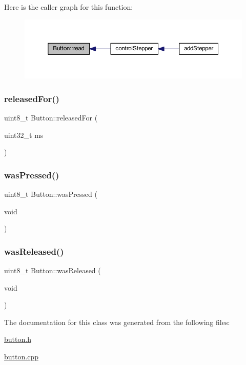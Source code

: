 Here is the caller graph for this function\+:\nopagebreak
\begin{figure}[H]
\begin{center}
\leavevmode
\includegraphics[width=350pt]{class_button_a5f5c0d23ab0e5387b861e68019a7e85d_icgraph}
\end{center}
\end{figure}
\mbox{\label{class_button_a805e542eaf9976b7c1afaf3dfecc13a5}} 
\subsubsection{\texorpdfstring{released\+For()}{releasedFor()}}
{\footnotesize\ttfamily uint8\+\_\+t Button\+::released\+For (\begin{DoxyParamCaption}\item[{uint32\+\_\+t}]{ms }\end{DoxyParamCaption})}

\mbox{\label{class_button_a3496a1689b2b2f5635d5c7716f38ec43}} 
\subsubsection{\texorpdfstring{was\+Pressed()}{wasPressed()}}
{\footnotesize\ttfamily uint8\+\_\+t Button\+::was\+Pressed (\begin{DoxyParamCaption}\item[{void}]{ }\end{DoxyParamCaption})}

\mbox{\label{class_button_a79164a7fd70f08cb8c3930e8c06b9190}} 
\subsubsection{\texorpdfstring{was\+Released()}{wasReleased()}}
{\footnotesize\ttfamily uint8\+\_\+t Button\+::was\+Released (\begin{DoxyParamCaption}\item[{void}]{ }\end{DoxyParamCaption})}



The documentation for this class was generated from the following files\+:\begin{DoxyCompactItemize}
\item 
\hyperlink{button_8h}{button.\+h}\item 
\hyperlink{button_8cpp}{button.\+cpp}\end{DoxyCompactItemize}
